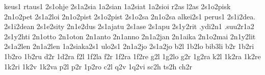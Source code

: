 {keus1       %
rtaus1
2s1ohje     %
2s1a2sia    %
1a2sian     %
1a2siat     %
1a2sioi     %
r2as l2as   %
2s1o2pisk   %
2n1o2pet
2s1a2loi
2n1o2pist    %
2s1o2pist
2s1o2sa      %
2n1o2sa      %
alkei2s1
perus1
2s1i2dea. 2s1i2dean
2s1e2sity    %
2n1e2dus     %
2s1ajatu     %
2s1ase
2s1apu
2s1y2rit     %
.ydi2n1
.suu2r1a2    %
2s1y2hti
2n1otto 2n1oton
2n1anto 2n1anno
2n1a2jan 2n1aika
2n1o2mai
2n1y2lit
2s1a2len
2n1a2len
1a2siaka2s1
ulo2s1        %
2n1a2jo       %
2s1a2jo
%
%
%
b2l 1b2lo bib3li
b2r 1b2ri 1b2ro 1b2ru
d2r 1d2ra
f2l 1f2la
f2r 1f2ra 1f2re
g2l 1g2lo
g2r 1g2ra
k2l
1k2ra 1k2re 1k2ri
1k2v 1k2va
p2l
p2r 1p2ro
c2l
q2v 1q2vi
sc2h ts2h
ch2r
}
\endgroup
\endinput
